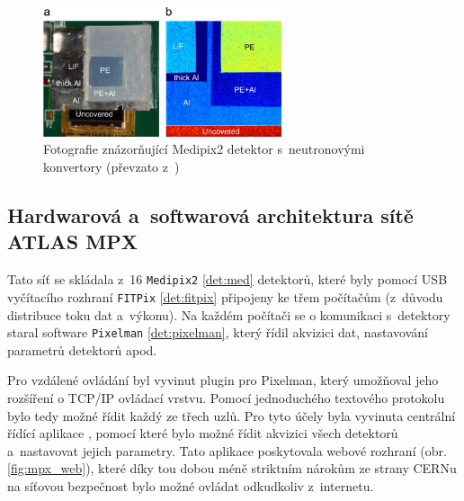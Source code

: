 \begin{figure}[ht]
	\begin{center}
		\includegraphics[width=7cm]{figures/mpx-layers.jpg}
		\caption{Fotografie znázorňující Medipix2 detektor s~neutronovými konvertory (převzato z~\cite{Vykydal200935})}
		\label{fig:mpx_lay}
	\end{center}
\end{figure}

\subsection{Hardwarová a~softwarová architektura sítě ATLAS MPX}
Tato síť se skládala z~16 \texttt{Medipix2} \ref{det:med} detektorů, které byly pomocí USB vyčítacího rozhraní \texttt{FITPix} \ref{det:fitpix} připojeny ke třem počítačům (z~důvodu distribuce toku dat a~výkonu). Na každém počítači se o komunikaci s~detektory staral software \texttt{Pixelman} \ref{det:pixelman}, který řídil akvizici dat, nastavování parametrů detektorů apod. 

Pro vzdálené ovládání byl vyvinut plugin pro Pixelman, který umožňoval jeho rozšíření o TCP/IP ovládací vrstvu. Pomocí jednoduchého textového protokolu bylo tedy možné řídit každý ze třech uzlů. Pro tyto účely byla vyvinuta centrální řídící aplikace \cite{Turecek2011S45}, pomocí které bylo možné řídit akvizici všech detektorů a~nastavovat jejich parametry. Tato aplikace poskytovala webové rozhraní (obr. \ref{fig:mpx_web}), které díky tou dobou méně 
striktním nárokům ze strany CERNu na síťovou bezpečnost bylo možné ovládat odkudkoliv z~internetu.

